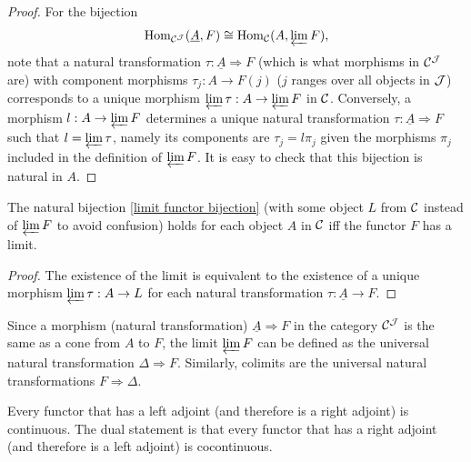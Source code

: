 \begin{proof}
    For the bijection 
    \[
        \operatorname{Hom}_{\mathcal{C} ^{\mathcal{J}} }(\underline{A},F)\cong \operatorname{Hom}_{\mathcal{C} }(A,\varprojlim F),\label{limit functor bijection}
    \]
    note that a natural transformation $\tau: \underline{A}\Longrightarrow F$ (which is what morphisms in $\mathcal{C} ^{\mathcal{J}} $ are) with component morphisms $\tau_j:A\to F(j)$ ($j$ ranges over all objects in $\mathcal{J} $) corresponds to a unique morphism $\varprojlim \tau: A\to \varprojlim F$ in $\mathcal{C} $. Conversely, a morphism $l:A\to \varprojlim F$ determines a unique natural transformation $\tau:\underline{A}\Longrightarrow F$ such that $l=\varprojlim \tau$, namely its components are $\tau_j=l\pi_j$ given the morphisms $\pi_j$ included in the definition of $\varprojlim F$. It is easy to check that this bijection is natural in $A$.
\end{proof}
\begin{cor}\label{corollary on limits}
    The natural bijection \eqref{limit functor bijection} (with some object $L$ from $\mathcal{C} $ instead of $\varprojlim F$ to avoid confusion) holds for each object $A$ in $\mathcal{C} $ iff the functor $F$ has a limit.
\end{cor}
\begin{proof}
    The existence of the limit is equivalent to the existence of a unique morphism $\varprojlim \tau: A\to L$ for each natural transformation $\tau:\underline{A}\to F$.
\end{proof}
\begin{rem}
    Since a morphism (natural transformation) $\underline{A}\Longrightarrow F$ in the category $\mathcal{C} ^{\mathcal{J}} $ is the same as a cone from $A$ to $F$, the limit $\varprojlim F$ can be defined as the universal natural transformation $\Delta \Longrightarrow F$. Similarly, colimits are the universal natural transformations $F\Longrightarrow \Delta$.
\end{rem}
\begin{thm}\label{continuity of adjoints thm}
    Every functor that has a left adjoint (and therefore is a right adjoint) is continuous. The dual statement is that every functor that has a right adjoint (and therefore is a left adjoint) is cocontinuous.
\end{thm}
